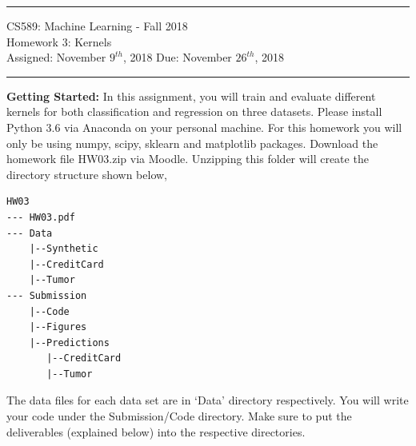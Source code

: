 \documentclass[11pt]{article}
\begin{document}
{\centering
  \rule{6.3in}{2pt}
  \vspace{1em}
  {\Large
    CS589: Machine Learning - Fall 2018\\
    Homework 3: Kernels\\
  }
  \vspace{1em}
  Assigned: November $9^{th}$, 2018 Due: November $26^{th}$, 2018\\
  \vspace{0.1em}
  \rule{6.3in}{1.5pt}
}
\vspace{1pc}

\textbf{Getting Started:} In this assignment, you will train and evaluate different kernels for both classification and regression on three datasets. Please install Python 3.6 via Anaconda on your personal machine. For this homework you will only be using numpy, scipy, sklearn and matplotlib packages. Download the homework file HW03.zip via Moodle. Unzipping this folder will create the directory structure shown below,
\begin{verbatim}
HW03
--- HW03.pdf
--- Data
    |--Synthetic
    |--CreditCard
    |--Tumor
--- Submission
    |--Code
    |--Figures
    |--Predictions
       |--CreditCard
       |--Tumor
\end{verbatim}
The data files for each data set are in `Data' directory respectively. You will write your code under the Submission/Code directory. Make sure to put the deliverables (explained below) into the respective directories.
\end{document}

